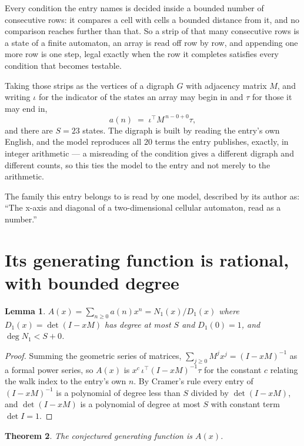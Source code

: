 \documentclass[11pt,a4paper]{article}
\theoremstyle{plain}
\newtheorem{theorem}{Theorem}
\newtheorem{lemma}[theorem]{Lemma}
\theoremstyle{definition}
\begin{document}
Every condition the entry names is decided inside a bounded number of consecutive rows: it
compares a cell with cells a bounded distance from it, and no comparison reaches further than
that. So a strip of that many consecutive rows is a state of a finite automaton, an array is
read off row by row, and appending one more row is one step, legal exactly when the row it
completes satisfies every condition that becomes testable.

Taking those strips as the vertices of a digraph $G$ with adjacency matrix $M$, and writing
$\iota$ for the indicator of the states an array may begin in and $\tau$ for those it may end
in,
\[
a(n)\;=\;\iota^{\!\top}M^{\,n-0+0}\tau ,
\]
and there are $S=23$ states. The digraph is built by reading the entry's own English, and the
model reproduces all $20$ terms the entry publishes, exactly, in integer arithmetic --- a
misreading of the condition gives a different digraph and different counts, so this ties the
model to the entry and not merely to the arithmetic.

The family this entry belongs to is read by one model, described by its author as: ``The x-axis and diagonal of a two-dimensional cellular automaton, read as a number.''


\section{Its generating function is rational, with bounded degree}

\begin{lemma}\label{lem:rat}
$A(x)=\sum_{n\ge0}a(n)x^n=N_1(x)/D_1(x)$ where $D_1(x)=\det(I-xM)$ has degree at most
$S$ and $D_1(0)=1$, and $\deg N_1<S+0$.
\end{lemma}

\begin{proof}
Summing the geometric series of matrices, $\sum_{j\ge0}M^jx^j=(I-xM)^{-1}$ as a formal
power series, so $A(x)$ is $x^{c}\,\iota^{\!\top}(I-xM)^{-1}\tau$ for the constant $c$
relating the walk index to the entry's own $n$. By Cramer's rule every entry of
$(I-xM)^{-1}$ is a polynomial of degree less than $S$ divided by $\det(I-xM)$, and
$\det(I-xM)$ is a polynomial of degree at most $S$ with constant term $\det I=1$.
\end{proof}

\begin{theorem}
The conjectured generating function is $A(x)$.
\end{theorem}
\end{document}
